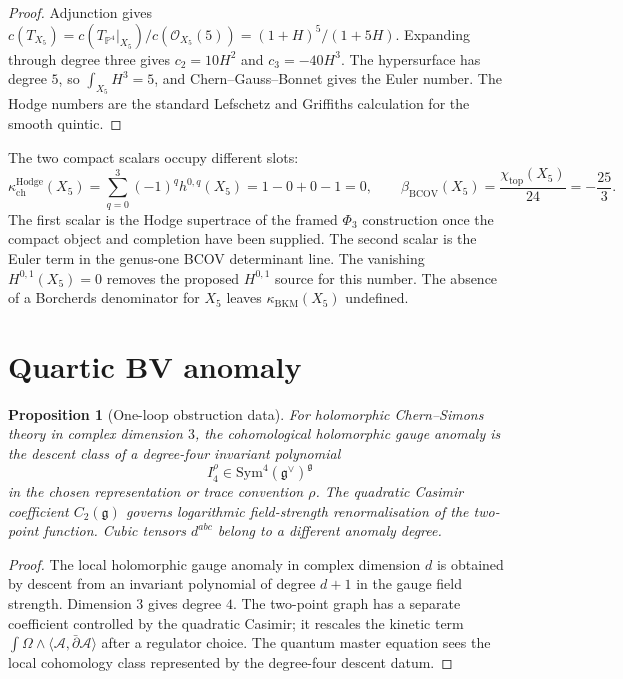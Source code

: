 \documentclass[11pt]{amsart}
\newtheorem{proposition}[theorem]{Proposition}
\providecommand{\kchHodge}{\kappa_{\mathrm{ch}}^{\mathrm{Hodge}}}
\providecommand{\kBKM}{\kappa_{\mathrm{BKM}}}
\providecommand{\bBCOV}{\beta_{\mathrm{BCOV}}}
\providecommand{\fg}{\mathfrak{g}}
\providecommand{\cA}{\mathcal{A}}
\providecommand{\cO}{\mathcal{O}}
\providecommand{\PP}{\mathbb{P}}
\providecommand{\Sym}{\mathrm{Sym}}
\begin{document}
\begin{proof}
Adjunction gives
$c(T_{X_5})=c(T_{\PP^4}|_{X_5})/c(\cO_{X_5}(5))=(1+H)^5/(1+5H)$.
Expanding through degree three gives $c_2=10H^2$ and $c_3=-40H^3$.
The hypersurface has degree $5$, so $\int_{X_5}H^3=5$, and
Chern--Gauss--Bonnet gives the Euler number. The Hodge numbers are the
standard Lefschetz and Griffiths calculation for the smooth quintic.
\end{proof}

The two compact scalars occupy different slots:
\[
  \kchHodge(X_5)=\sum_{q=0}^3(-1)^q h^{0,q}(X_5)
  =1-0+0-1=0,
  \qquad
  \bBCOV(X_5)=\frac{\chi_{\mathrm{top}}(X_5)}{24}=-\frac{25}{3}.
\]
The first scalar is the Hodge supertrace of the framed $\Phi_3$
construction once the compact object and completion have been supplied.
The second scalar is the Euler term in the genus-one BCOV determinant
line. The vanishing $H^{0,1}(X_5)=0$ removes the proposed
$H^{0,1}$ source for this number. The absence of a Borcherds
denominator for $X_5$ leaves $\kBKM(X_5)$ undefined.

\section*{Quartic BV anomaly}
\label{sec:hcs-quintic-anomaly}

\begin{proposition}[One-loop obstruction data]
\label{prop:hcs-quintic-anomaly-data}
For holomorphic Chern--Simons theory in complex dimension $3$, the
cohomological holomorphic gauge anomaly is the descent class of a
degree-four invariant polynomial
\[
  I_4^\rho \in \Sym^4(\fg^\vee)^\fg
\]
in the chosen representation or trace convention $\rho$. The quadratic
Casimir coefficient $C_2(\fg)$ governs logarithmic field-strength
renormalisation of the two-point function. Cubic tensors $d^{abc}$
belong to a different anomaly degree.
\end{proposition}

\begin{proof}
The local holomorphic gauge anomaly in complex dimension $d$ is
obtained by descent from an invariant polynomial of degree $d+1$ in
the gauge field strength. Dimension $3$ gives degree $4$. The two-point
graph has a separate coefficient controlled by the quadratic Casimir;
it rescales the kinetic term
$\int\Omega\wedge\langle\cA,\bar\partial\cA\rangle$ after a regulator
choice. The quantum master equation sees the local cohomology class
represented by the degree-four descent datum.
\end{proof}
\end{document}
